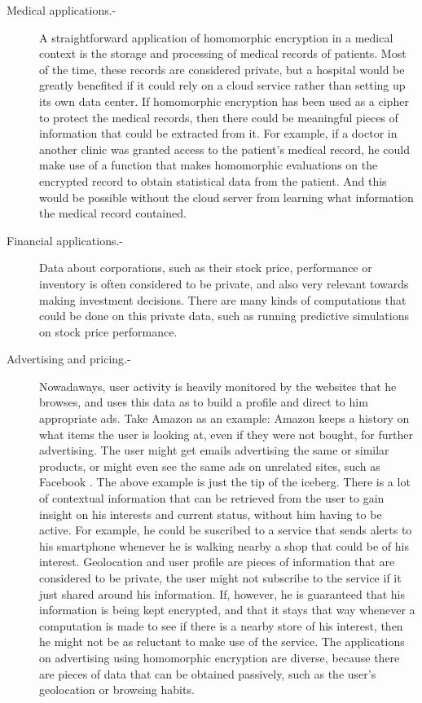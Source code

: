\begin{description}
\item[Medical applications.-] A straightforward application of homomorphic encryption in a medical context is the storage and processing of medical records of patients. Most of the time, these records are considered private, but a hospital would be greatly benefited if it could rely on a cloud service rather than setting up its own data center. If homomorphic encryption has been used as a cipher to protect the medical records, then there could be meaningful pieces of information that could be extracted from it. For example, if a doctor in another clinic was granted access to the patient's medical record, he could make use of a function that makes homomorphic evaluations on the encrypted record to obtain statistical data from the patient. And this would be possible without the cloud server from learning what information the medical record contained.
\item[Financial applications.-] Data about corporations, such as their stock price, performance or inventory is often considered to be private, and also very relevant towards making investment decisions. There are many kinds of computations that could be done on this private data, such as running predictive simulations on stock price performance. 
\item[Advertising and pricing.-] Nowadaways, user activity is heavily monitored by the websites that he browses, and uses this data as to build a profile and direct to him appropriate ads. Take Amazon as an example: Amazon keeps a history on what items the user is looking at, even if they were not bought, for further advertising. The user might get emails advertising the same or similar products, or might even see the same ads on unrelated sites, such as Facebook \cite{KimMai}. 
  The above example is just the tip of the iceberg. There is a lot of contextual information that can be retrieved from the user to gain insight on his interests and current status, without him having to be active. For example, he could be suscribed to a service that sends alerts to his smartphone whenever he is walking nearby a shop that could be of his interest. Geolocation and user profile are pieces of information that are considered to be private, the user might not subscribe to the service if it just shared around his information. If, however, he is guaranteed that his information is being kept encrypted, and that it stays that way whenever a computation is made to see if there is a nearby store of his interest, then he might not be as reluctant to make use of the service. The applications on advertising using homomorphic encryption are diverse, because there are pieces of data that can be obtained passively, such as the user's geolocation or browsing habits.

\end{description}
